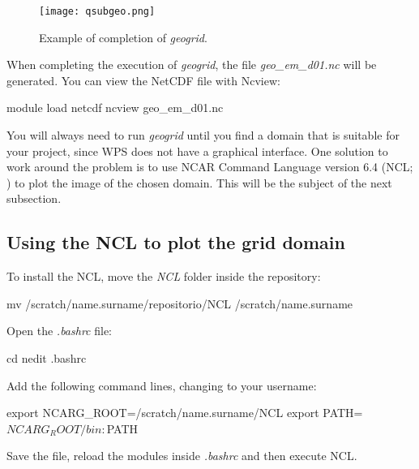 \bigskip

\begin{figure}[H]
    \centering
    \texttt{[image: qsubgeo.png]}
    \caption{Example of completion of \textit{geogrid}.}
    \label{qsubgeofinal}
\end{figure}
\bigskip

\noindent When completing the execution of \textit{geogrid}, the file \textit{geo\_em\_d01.nc} will be generated.
 You can view the NetCDF file with Ncview:
\bigskip

\begin{bashcode}
module load netcdf
ncview geo_em_d01.nc
\end{bashcode}
\bigskip

\noindent You will always need to run \textit{geogrid} until you find a domain that is suitable for your project, 
since WPS does not have a graphical interface. One solution to work around the problem is to use NCAR Command Language version 6.4 
(NCL; \cite{Ncl2017}) to plot the image of the chosen domain. This will be the subject of the next subsection.

\bigskip

\subsection{Using the NCL to plot the grid domain}
\bigskip

\noindent To install the NCL, move the \textit{NCL} folder inside the repository:
\bigskip

\begin{bashcode}
mv /scratch/name.surname/repositorio/NCL /scratch/name.surname
\end{bashcode}
\bigskip

\noindent Open the \textit{.bashrc} file:
\bigskip

\begin{bashcode}
cd
nedit .bashrc
\end{bashcode}
\bigskip

\noindent Add the following command lines, changing to your username:
\bigskip

\begin{bashcode}
export NCARG_ROOT=/scratch/name.surname/NCL
export PATH=$NCARG_ROOT/bin:$PATH
\end{bashcode}
\bigskip

\noindent Save the file, reload the modules inside \textit{.bashrc} and then execute NCL.
\bigskip


